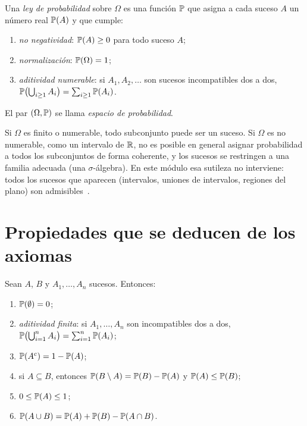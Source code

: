 \begin{definicion}\label{def:t3-axiomas}
Una \emph{ley de probabilidad} sobre $\Omega$ es una función $\mathbb{P}$ que asigna a cada suceso $A$ un número real $\mathbb{P}(A)$ y que cumple:
\begin{enumerate}
  \item \emph{no negatividad}: $\mathbb{P}(A)\ge0$ para todo suceso $A$;
  \item \emph{normalización}: $\mathbb{P}(\Omega)=1$;
  \item \emph{aditividad numerable}: si $A_1,A_2,\dots$ son sucesos incompatibles dos a dos, $\mathbb{P}\bigl(\bigcup_{i\ge1}A_i\bigr)=\sum_{i\ge1}\mathbb{P}(A_i)$.
\end{enumerate}
El par $(\Omega,\mathbb{P})$ se llama \emph{espacio de probabilidad}.
\end{definicion}

\begin{observacion}
Si $\Omega$ es finito o numerable, todo subconjunto puede ser un suceso. Si $\Omega$ es no numerable, como un intervalo de $\mathbb{R}$, no es posible en general asignar probabilidad a todos los subconjuntos de forma coherente, y los sucesos se restringen a una familia adecuada (una $\sigma$-álgebra). En este módulo esa sutileza no interviene: todos los sucesos que aparecen (intervalos, uniones de intervalos, regiones del plano) son admisibles~\cite[§1.6]{bh}.
\end{observacion}

\section{Propiedades que se deducen de los axiomas}

\begin{proposicion}\label{prop:t3-props}
Sean $A$, $B$ y $A_1,\dots,A_n$ sucesos. Entonces:
\begin{enumerate}
  \item $\mathbb{P}(\emptyset)=0$;
  \item \emph{aditividad finita}: si $A_1,\dots,A_n$ son incompatibles dos a dos, $\mathbb{P}\bigl(\bigcup_{i=1}^{n}A_i\bigr)=\sum_{i=1}^{n}\mathbb{P}(A_i)$;
  \item $\mathbb{P}(A^{c})=1-\mathbb{P}(A)$;
  \item si $A\subseteq B$, entonces $\mathbb{P}(B\setminus A)=\mathbb{P}(B)-\mathbb{P}(A)$ y $\mathbb{P}(A)\le\mathbb{P}(B)$;
  \item $0\le\mathbb{P}(A)\le1$;
  \item $\mathbb{P}(A\cup B)=\mathbb{P}(A)+\mathbb{P}(B)-\mathbb{P}(A\cap B)$.
\end{enumerate}
\end{proposicion}

